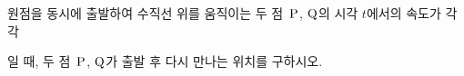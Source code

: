 원점을 동시에 출발하여 수직선 위를 움직이는 두 점~$\mathrm{P}$, $\mathrm{Q}$의 시각 $t$에서의 속도가 각각\par\smallskip{}\par\smallskip\noindent 일 때, 두 점~$\mathrm{P}$, $\mathrm{Q}$가 출발 후 다시 만나는 위치를 구하시오.
